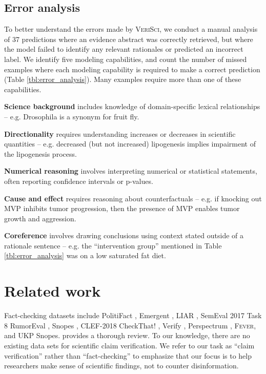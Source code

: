 \documentclass[11pt,a4paper]{article}
\newcommand{\sysname}{\textsc{VeriSci}\xspace}
\newcommand{\fever}{\textsc{Fever}\xspace}
\newcommand{\snopes}{UKP Snopes\xspace}
\begin{document}
\subsection{Error analysis} \label{sec:error_analysis}
To better understand the errors made by \sysname, we conduct a manual analysis of 37 predictions where an evidence abstract was correctly retrieved, but where the model failed to identify any relevant rationales or predicted an incorrect label. We identify five modeling capabilities, and count the number of missed examples where each modeling capability is required to make a correct prediction (Table \ref{tbl:error_analysis}). Many examples require more than one of these capabilities.

\begin{description}[leftmargin=*,leftmargin=0pt]
  \item \textbf{Science background} includes knowledge of domain-specific lexical relationships -- e.g. Drosophila is a synonym for fruit fly.
  \item \textbf{Directionality} requires understanding increases or decreases in scientific quantities -- e.g. decreased (but not increased) lipogenesis implies impairment of the lipogenesis process.
  \item \textbf{Numerical reasoning} involves interpreting numerical or statistical statements, often reporting confidence intervals or p-values.
  \item \textbf{Cause and effect} requires reasoning about counterfactuals -- e.g. if knocking out MVP inhibits tumor progression, then the presence of MVP enables tumor growth and aggression.
  \item \textbf{Coreference} involves drawing conclusions using context stated outside of a rationale sentence -- e.g. the ``intervention group'' mentioned in Table \ref{tbl:error_analysis} was on a low saturated fat diet.
\end{description}




 \section{Related work}

\label{sec:related_work}

Fact-checking datasets include PolitiFact \cite{Vlachos2014FactCT}, Emergent \cite{ferreira-vlachos-2016-emergent}, LIAR \cite{Wang2017LiarLP}, SemEval 2017 Task 8 RumorEval \cite{derczynski-etal-2017-semeval}, Snopes \cite{Popat2017WhereTT}, CLEF-2018 CheckThat! \cite{nakov2018overview}, Verify \cite{baly-etal-2018-integrating}, Perspectrum \cite{Chen2019SeeingTF}, \fever \cite{Thorne2018FEVERAL}, and \snopes \cite{Hanselowski2019ARA}. \cite{Hanselowski2019ARA} provides a thorough review.  To our knowledge, there are no existing data sets for scientific claim verification. We refer to our task as ``claim verification'' rather than ``fact-checking'' to emphasize that our focus is to help researchers make sense of scientific findings, not to counter disinformation.
\end{document}
